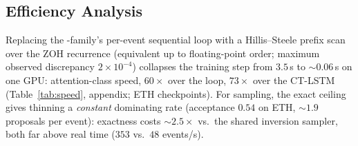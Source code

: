 \subsection{Efficiency Analysis}
\label{sec:efficiency}
Replacing the \sppp-family's per-event sequential loop with a
Hillis--Steele prefix scan \citep{hillis1986scan} over the ZOH recurrence
(equivalent up to floating-point order; maximum observed discrepancy
$2\!\times\!10^{-4}$) collapses the training step from $3.5$\,s to
${\sim}0.06$\,s on one GPU: attention-class speed, $60\times$ over the
loop, $73\times$ over the CT-LSTM (Table~\ref{tab:speed}, appendix; ETH
checkpoints). For sampling, the exact ceiling gives thinning a
\emph{constant} dominating rate (acceptance $0.54$ on ETH, ${\sim}1.9$
proposals per event): exactness costs ${\sim}2.5\times$ vs.\ the shared
inversion sampler, both far above real time ($353$ vs.\ $48$ events/s).
